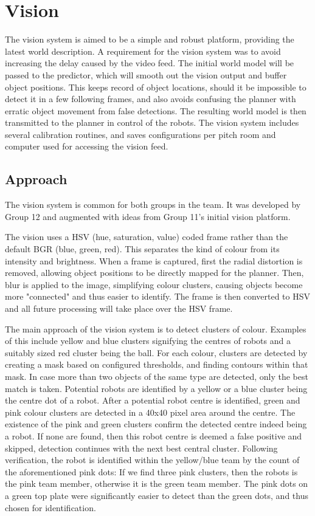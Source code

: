 \section{Vision}

The vision system is aimed to be a simple and robust platform, providing the latest world description. A requirement for the vision system was to avoid increasing the delay caused by the video feed. The initial world model will be passed to the predictor, which will smooth out the vision output and buffer object positions. This keeps record of object locations, should it be impossible to detect it in a few following frames, and also avoids confusing the planner with erratic object movement from false detections. The resulting world model is then transmitted to the planner in control of the robots. The vision system includes several calibration routines, and saves configurations per pitch room and computer used for accessing the vision feed.

\subsection{Approach}

The vision system is common for both groups in the team. It was developed by Group 12 and augmented with ideas from Group 11's initial vision platform. 

The vision uses a HSV (hue, saturation, value) coded frame rather than the default BGR (blue, green, red). This separates the kind of colour from its intensity and brightness. When a frame is captured, first the radial distortion is removed, allowing object positions to be directly mapped for the planner. Then, blur is applied to the image, simplifying colour clusters, causing objects become more "connected" and thus easier to identify. The frame is then converted to HSV and all future processing will take place over the HSV frame.

The main approach of the vision system is to detect clusters of colour. Examples of this include yellow and blue clusters signifying the centres of robots and a suitably sized red cluster being the ball. For each colour, clusters are detected by creating a mask based on configured thresholds, and finding contours within that mask. In case more than two objects of the same type are detected, only the best match is taken. Potential robots are identified by a yellow or a blue cluster being the centre dot of a robot. After a potential robot centre is identified, green and pink colour clusters are detected in a 40x40 pixel area around the centre. The existence of the pink and green clusters confirm the detected centre indeed being a robot. If none are found, then this robot centre is deemed a false positive and skipped, detection continues with the next best central cluster.  Following verification, the robot is identified within the yellow/blue team by the count of the aforementioned pink dots: If we find three pink clusters, then the robots is the pink team member, otherwise it is the green team member. The pink dots on a green top plate were significantly easier to detect than the green dots, and thus chosen for identification.

